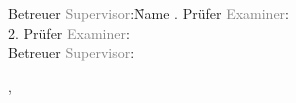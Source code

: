\begin{titlepage}
{	\vspace*{1\baselineskip}
	\begin{center}
		\textbf{\myAuthor}
	\end{center}
	
	\vfill
	\begin{tabbing}
		Betreuer \textcolor{grey}{Supervisor}:\quad \= Name . Prüfer \textcolor{grey}{Examiner}:\>\myFirstReviewer\\
		2. Prüfer \textcolor{grey}{Examiner}:\>\mySecondReviewer\\
		Betreuer \textcolor{grey}{Supervisor}:\>\mySupervisor\\
	\end{tabbing}

	\begin{flushright}
		\myExamLocation, \myExamDate
	\end{flushright}
	}
\end{titlepage}